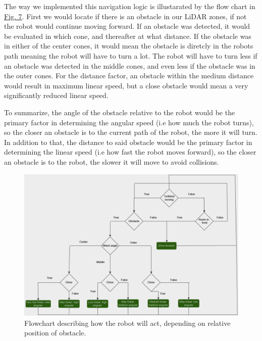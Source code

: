 \documentclass[conference]{IEEEtran}
\begin{document}
The way we implemented this navigation logic is illustarated by the flow chart in \href{sec:flowchart}{Fig. 7}. 
First we would locate if there is an obstacle in our LiDAR zones, if not the robot would continue moving forward.
If an obstacle was detected, it would be evaluated in which cone, and thereafter at what distance.
If the obstacle was in either of the center cones, it would mean the obstacle is diretcly in the robots path meaning the robot will have to turn a lot.
The robot will have to turn less if an obstacle was detected in the middle cones, and even less if the obstacle was in the outer cones.
For the distance factor, an obstacle within the medium distance would result in maximum linear speed, but a close obstacle would mean a very significantly reduced linear speed.

To summarize, the angle of the obstacle relative to the robot would be the primary factor in determining the angular speed (i.e how much the robot turns), so the closer an obstacle is to the current path of the robot, the more it will turn.
In addition to that, the distance to said obstacle would be the primary factor in determining the linear speed (i.e how fast the robot moves forward), so the closer an obstacle is to the robot, the slower it will move to avoid collisions.
\begin{figure}[htbp]
    \centerline{\includegraphics[width=1.0\columnwidth]{Pictures/Flowchart.png}}
    \caption{Flowchart describing how the robot will act, depending on relative position of obstacle.}
    \label{sec:flowchart}
    \end{figure}
\end{document}
